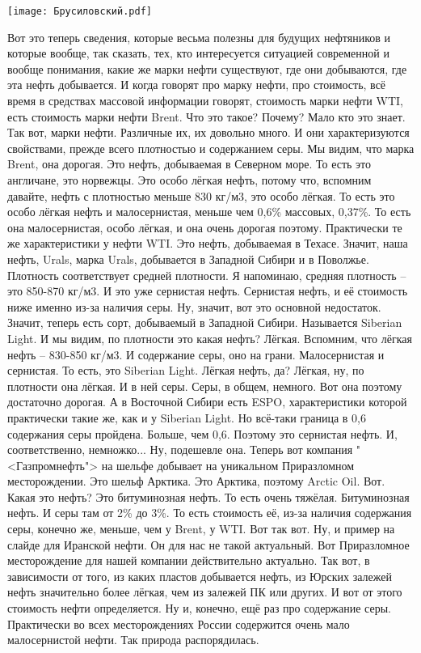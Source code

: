 \documentclass[main.tex]{subfiles}
\begin{document}
\begin{center}
\texttt{[image: Брусиловский.pdf]}
\end{center}

Вот это теперь сведения, которые весьма полезны для будущих нефтяников и которые вообще, так сказать, тех, кто интересуется ситуацией современной
и вообще понимания, какие же марки нефти существуют, где они добываются, где эта нефть добывается.
И когда говорят про марку нефти, про стоимость, всё время в средствах массовой информации говорят, стоимость марки нефти WTI, есть стоимость марки нефти Brent.
Что это такое? Почему?
Мало кто это знает.
Так вот, марки нефти.
Различные их, их довольно много.
И они характеризуются свойствами, прежде всего плотностью и содержанием серы.
Мы видим, что марка Brent, она дорогая.
Это нефть, добываемая в Северном море.
То есть это англичане, это норвежцы.
Это особо лёгкая нефть, потому что, вспомним давайте, нефть с плотностью меньше 830 кг/м3, это особо лёгкая.
То есть это особо лёгкая нефть и малосернистая, меньше чем 0,6\% массовых, 0,37\%.
То есть она малосернистая, особо лёгкая, и она очень дорогая поэтому.
Практически те же характеристики у нефти WTI.
Это нефть, добываемая в Техасе.
Значит, наша нефть, Urals, марка Urals, добывается в Западной Сибири и в Поволжье.
Плотность соответствует средней плотности.
Я напоминаю, средняя плотность -- это 850-870 кг/м3.
И это уже сернистая нефть.
Сернистая нефть, и её стоимость ниже именно из-за наличия серы.
Ну, значит, вот это основной недостаток.
Значит, теперь есть сорт, добываемый в Западной Сибири.
Называется Siberian Light.
И мы видим, по плотности это какая нефть?
Лёгкая.
Вспомним, что лёгкая нефть -- 830-850 кг/м3.
И содержание серы, оно на грани.
Малосернистая и сернистая.
То есть, это Siberian Light.
Лёгкая нефть, да?
Лёгкая, ну, по плотности она лёгкая.
И в ней серы.
Серы, в общем, немного.
Вот она поэтому достаточно дорогая.
А в Восточной Сибири есть ESPO, характеристики которой практически такие же, как и у Siberian Light.
Но всё-таки граница в 0,6 содержания серы пройдена.
Больше, чем 0,6.
Поэтому это сернистая нефть.
И, соответственно, немножко...
Ну, подешевле она.
Теперь вот компания "<Газпромнефть"> на шельфе добывает на уникальном Приразломном месторождении.
Это шельф Арктика.
Это Арктика, поэтому Arctic Oil.
Вот. Какая это нефть?
Это битуминозная нефть.
То есть очень тяжёлая.
Битуминозная нефть.
И серы там от 2\% до 3\%.
То есть стоимость её, из-за наличия содержания серы, конечно же, меньше, чем у Brent, у WTI.
Вот так вот.
Ну, и пример на слайде для Иранской нефти.
Он для нас не такой актуальный.
Вот Приразломное месторождение для нашей компании действительно актуально.
Так вот, в зависимости от того, из каких пластов добывается нефть, из Юрских залежей нефть значительно более лёгкая, чем из залежей ПК или других.
И вот от этого стоимость нефти определяется.
Ну и, конечно, ещё раз про содержание серы.
Практически во всех месторождениях России содержится очень мало малосернистой нефти.
Так природа распорядилась.
\end{document}
